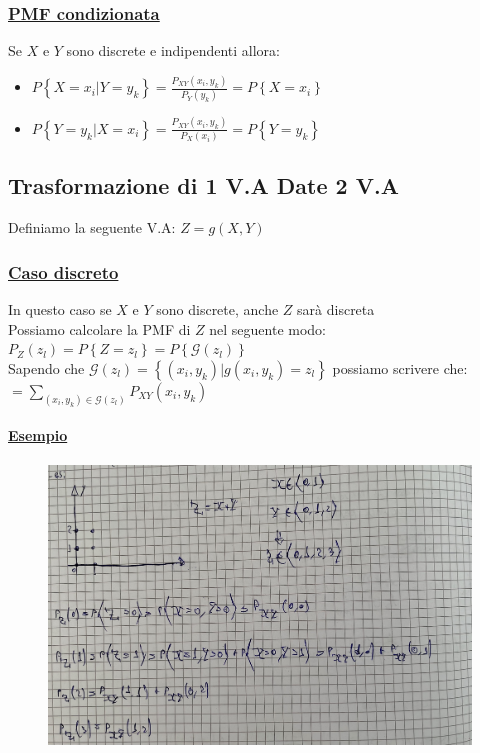 \documentclass{article}
\begin{document}
\subsubsection{\underline{PMF condizionata}}
Se $X$ e $Y$ sono discrete e indipendenti allora: 
\begin{itemize}
    \item $P\left\{ X = x_i| Y = y_k\right\} = \frac{P_{XY}(x_i,y_k)}{P_Y(y_k)} = P\left\{ X = x_i \right\}$
    \item $P\left\{ Y = y_k| X = x_i\right\} = \frac{P_{XY}(x_i,y_k)}{P_X(x_i)} = P\left\{ Y = y_k \right\}$
\end{itemize}

\subsection{Trasformazione di 1 V.A Date 2 V.A}
Definiamo la seguente V.A: $Z = g(X,Y)$
\subsubsection{\underline{Caso discreto}}
In questo caso se $X$ e $Y$ sono discrete, anche $Z$ sarà discreta \\
Possiamo calcolare la PMF di $Z$ nel seguente modo: \\
$P_Z(z_l) = P\left\{ Z = z_l\right\} = P\left\{ \mathcal{G}(z_l)\right\}$ \\
Sapendo che $\mathcal{G}(z_l) = \left\{ (x_i,y_k) | g(x_i,y_k) = z_l \right\}$ possiamo scrivere che: \\
$= \sum_{(x_i,y_k) \in \mathcal{G}(z_l)} P_{XY}(x_i,y_k)$
\paragraph{\underline{Esempio}}
\begin{figure}[ht]
\centering
\includegraphics[scale=0.14]{ese/45.jpeg}
\end{figure} 
\end{document}
